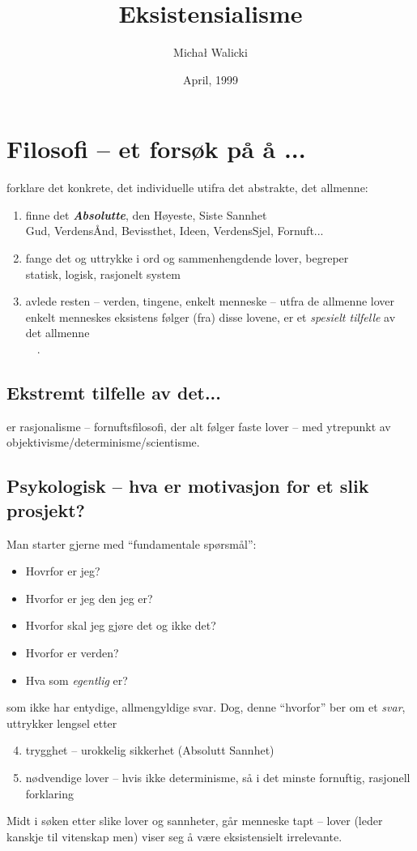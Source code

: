 \documentclass[12pt]{article}
\title{Eksistensialisme}
\author{Micha{\l} Walicki}
\date{April, 1999}
\newcommand{\MyLPar}{\parsep -.2ex plus.2ex minus.2ex\itemsep\parsep
   \vspace{-\topsep}\vspace{.5ex}}
\newcommand{\co}[1]{{\bf\em #1\/}}
\newcommand{\ut}[1]{\\ \ \ .\dotfill{\small\bf #1}}
\newcommand{\ite}[1]{\item[{\bf #1})]}
\begin{document}

\section{Filosofi -- et fors{\o}k p{\aa} {\aa} ...}
forklare det konkrete, det individuelle utifra det abstrakte, det allmenne:
\begin{enumerate}
\ite{f1} finne det \co{Absolutte}, den {H{\o}yeste, Siste Sannhet}\\
Gud, Verdens{\AA}nd, Bevissthet, Ideen, VerdensSjel, Fornuft...
\ite{f2} fange det og uttrykke i ord og sammenhengdende lover, 
begreper\\
statisk, logisk, rasjonelt system
\ite{f3} avlede resten -- verden, tingene, enkelt menneske -- utfra de allmenne
lover\\
enkelt menneskes eksistens f{\o}lger (fra) disse lovene, er et {\em spesielt
tilfelle} av det allmenne \ut{det Allmenne -- det Individuelle}
\end{enumerate}

\subsection*{Ekstremt tilfelle av det...}
er rasjonalisme -- fornuftsfilosofi, der alt f{\o}lger faste lover -- med
ytrepunkt av objektivisme/determinisme/scientisme.

\subsection*{Psykologisk -- hva er motivasjon for et slik prosjekt?}
Man starter gjerne med ``fundamentale sp{\o}rsm{\aa}l'': 
\begin{itemize}\MyLPar
\item Hovrfor er jeg?
\item Hvorfor er jeg den jeg er?
\item Hvorfor skal jeg gj{\o}re det og ikke det?
\item Hvorfor er verden?
\item Hva som {\em egentlig} er?
\end{itemize}
som ikke  har entydige, allmengyldige svar. Dog, denne ``hvorfor'' ber om et {\em
svar}, uttrykker lengsel etter
\begin{enumerate}\setcounter{enumi}{3}
\ite{f4} trygghet -- urokkelig sikkerhet (Absolutt Sannhet)
\ite{f5} n{\o}dvendige lover -- hvis ikke determinisme, s{\aa} i det minste fornuftig, rasjonell
forklaring 
\end{enumerate}
Midt i s{\o}ken etter slike lover og sannheter, g{\aa}r menneske tapt --
lover (leder kanskje til vitenskap men) viser seg {\aa} v{\ae}re eksistensielt
irrelevante.
\end{document}
